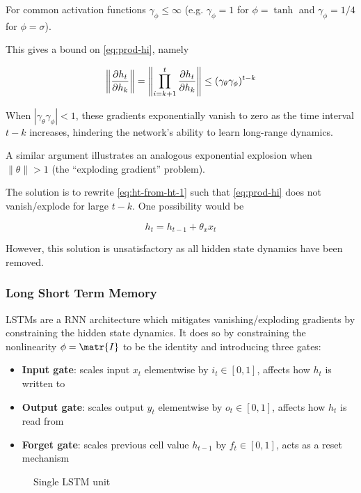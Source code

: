 For common activation functions $\gamma_{\phi} \leq \infty$ (e.g. $\gamma_\phi = 1$ for $\phi = \tanh$
and $\gamma_\phi = 1/4$ for $\phi = \sigma$).

This gives a bound on \autoref{eq:prod-hi}, namely

\begin{equation}
    \left\| \frac{\partial h_t}{\partial h_k} \right\|
    = \left\| \prod_{i=k+1}^{t} \frac{\partial h_t}{\partial h_k} \right\|
    \leq (\gamma_\theta \gamma_\phi)^{t-k}
\end{equation}

When $|\gamma_\theta \gamma_\phi| < 1$, these gradients exponentially vanish to zero as
the time interval $t - k$ increases, hindering the network's ability to learn long-range
dynamics.

A similar argument \cite{Bengio1994} illustrates an analogous exponential explosion
when $\|\theta\| > 1$ (the ``exploding gradient'' problem).

The solution is to rewrite \autoref{eq:ht-from-ht-1} such that
\autoref{eq:prod-hi} does not vanish/explode for large $t - k$.
One possibility would be

\begin{equation}
    h_t = h_{t-1} + \theta_x x_t
\end{equation}

However, this solution is unsatisfactory as all hidden state dynamics have been
removed.

\subsubsection{Long Short Term Memory}

LSTMs are a RNN architecture which mitigates vanishing/exploding gradients by constraining
the hidden state dynamics. It does so by constraining the nonlinearity $\phi = \matr{I}$ to be the
identity and introducing three gates:
\begin{itemize}
    \item \textbf{Input gate}: scales input $x_t$ elementwise by $i_t \in [0,1]$, affects how $h_t$ is written to
    \item \textbf{Output gate}: scales output $y_t$ elementwise by $o_t \in [0,1]$, affects how $h_t$ is read from
    \item \textbf{Forget gate}: scales previous cell value $h_{t-1}$ by $f_t \in [0,1]$, acts as a reset mechanism
\end{itemize}

\begin{figure}[htpb]
    \centering
    
    \caption{Single LSTM unit}
    \label{fig:lstm-unit}
\end{figure}

